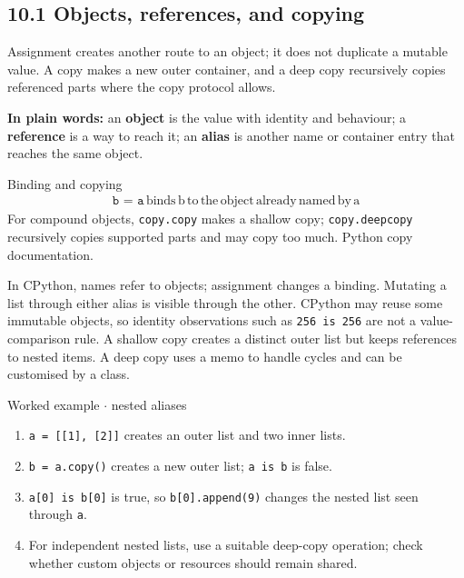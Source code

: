 \documentclass[11pt]{article}
\begin{document}
\begin{keepsection}
\section{10.1 Objects, references, and copying}

Assignment creates another route to an object; it does not duplicate a mutable value. A copy makes a new outer container, and a deep copy recursively copies referenced parts where the copy protocol allows.

\begin{plainbox}\textbf{In plain words:} an \textbf{object} is the value with identity and behaviour; a \textbf{reference} is a way to reach it; an \textbf{alias} is another name or container entry that reaches the same object.\end{plainbox}

\begin{equationcard}{Binding and copying}
\[ \begin{gathered} \texttt{b = a}\, \text{binds}\, \mathrm{b}\, \text{to}\, \text{the}\, \text{object}\, \text{already}\, \text{named}\, \text{by}\, \mathrm{a} \end{gathered} \]
{\small For compound objects, \texttt{copy.copy} makes a shallow copy; \texttt{copy.deepcopy} recursively copies supported parts and may copy too much. Python copy documentation.}
\end{equationcard}

In CPython, names refer to objects; assignment changes a binding. Mutating a list through either alias is visible through the other. CPython may reuse some immutable objects, so identity observations such as \texttt{256 is 256} are not a value-comparison rule. A shallow copy creates a distinct outer list but keeps references to nested items. A deep copy uses a memo to handle cycles and can be customised by a class.

\begin{workedbox}{Worked example \ensuremath{\cdot} nested aliases}
\begin{enumerate}
\item \texttt{a = [[1], [2]]} creates an outer list and two inner lists.
\item \texttt{b = a.copy()} creates a new outer list; \texttt{a is b} is false.
\item \texttt{a[0] is b[0]} is true, so \texttt{b[0].append(9)} changes the nested list seen through \texttt{a}.
\item For independent nested lists, use a suitable deep-copy operation; check whether custom objects or resources should remain shared.
\end{enumerate}
\end{workedbox}


\end{keepsection}
\end{document}
